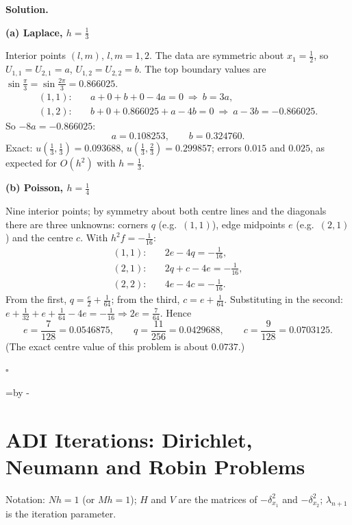 \documentclass[11pt,a4paper]{article}
\makeatletter
\newcommand{\Needspace}[1]{\par\penalty-100\begingroup
  \dimen@=#1\relax
  \dimen@ii=\pagegoal\advance\dimen@ii by -\pagetotal
  \ifdim\dimen@>\dimen@ii\ifdim\dimen@ii>\z@\vfil\fi\break\fi
  \endgroup}
\newenvironment{solution}
  {\par\noindent\textbf{Solution.}\par\nobreak}
  {\par\nobreak\noindent\hfill\(\square\)\par}
\newcommand{\step}[1]{\par\addvspace{0.5em}\noindent\textbf{#1}\par\nobreak}
\newcommand{\lam}{\lambda_{n+1}}
\makeatother
\begin{document}
\begin{solution}
\step{(a) Laplace, \(h=\frac13\)}
Interior points \((l,m)\), \(l,m=1,2\).  The data are symmetric about
\(x_1=\frac12\), so \(U_{1,1}=U_{2,1}=a\), \(U_{1,2}=U_{2,2}=b\).  The
top boundary values are \(\sin\frac\pi3=\sin\frac{2\pi}3=0.866025\).
\begin{align*}
  (1,1):&\quad a+0+b+0-4a=0\ \Rightarrow\ b=3a,\\
  (1,2):&\quad b+0+0.866025+a-4b=0\ \Rightarrow\ a-3b=-0.866025 .
\end{align*}
So \(-8a=-0.866025\):
\[
  a=0.108253,\qquad b=0.324760 .
\]
Exact: \(u(\frac13,\frac13)=0.093688\), \(u(\frac13,\frac23)=0.299857\);
errors \(0.015\) and \(0.025\), as expected for \(O(h^2)\) with
\(h=\frac13\).

\step{(b) Poisson, \(h=\frac14\)}
Nine interior points; by symmetry about both centre lines and the
diagonals there are three unknowns: corners \(q\) (e.g.\ \((1,1)\)),
edge midpoints \(e\) (e.g.\ \((2,1)\)) and the centre \(c\).  With
\(h^2f=-\frac1{16}\):
\begin{align*}
  (1,1):&\quad 2e-4q=-\tfrac1{16},\\
  (2,1):&\quad 2q+c-4e=-\tfrac1{16},\\
  (2,2):&\quad 4e-4c=-\tfrac1{16}.
\end{align*}
From the first, \(q=\frac e2+\frac1{64}\); from the third,
\(c=e+\frac1{64}\).  Substituting in the second:
\(e+\frac1{32}+e+\frac1{64}-4e=-\frac1{16}\Rightarrow2e=\frac7{64}\).
Hence
\[
  e=\frac7{128}=0.0546875,\qquad q=\frac{11}{256}=0.0429688,\qquad
  c=\frac9{128}=0.0703125 .
\]
(The exact centre value of this problem is about \(0.0737\).)
\end{solution}

\Needspace{32\baselineskip}
\section{ADI Iterations: Dirichlet, Neumann and Robin Problems}\label{sec:adi}

Notation: \(Nh=1\) (or \(Mh=1\)); \(H\) and \(V\) are the matrices of
\(-\delta_{x_1}^2\) and \(-\delta_{x_2}^2\); \(\lam\) is the iteration
parameter.
\end{document}
